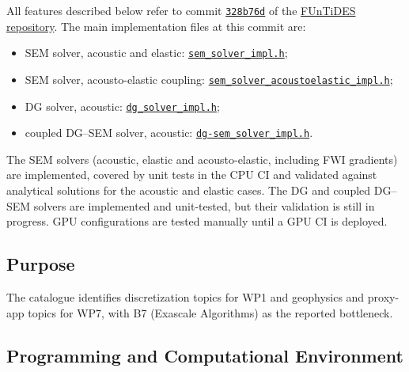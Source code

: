 All features described below refer to commit
\href{https://github.com/FUnTiDES-sim/FUnTiDES/tree/328b76d4c583bd0532de68b2e60e56ce13c694e5}{\texttt{328b76d}}
of the \href{https://github.com/FUnTiDES-sim/FUnTiDES}{FUnTiDES repository}.
The main implementation files at this commit are:
\begin{itemize}
  \item SEM solver, acoustic and elastic:
  \href{https://github.com/FUnTiDES-sim/FUnTiDES/blob/328b76d4c583bd0532de68b2e60e56ce13c694e5/src/solver/fe/impl/common/include/sem_solver_impl.h}{\texttt{sem\_solver\_impl.h}};
  \item SEM solver, acousto-elastic coupling:
  \href{https://github.com/FUnTiDES-sim/FUnTiDES/blob/328b76d4c583bd0532de68b2e60e56ce13c694e5/src/solver/fe/impl/acoustoelastic/include/sem_solver_acoustoelastic_impl.h}{\texttt{sem\_solver\_acoustoelastic\_impl.h}};
  \item DG solver, acoustic:
  \href{https://github.com/FUnTiDES-sim/FUnTiDES/blob/328b76d4c583bd0532de68b2e60e56ce13c694e5/src/solver/fe/DG/impl/common/include/dg_solver_impl.h}{\texttt{dg\_solver\_impl.h}};
  \item coupled DG--SEM solver, acoustic:
  \href{https://github.com/FUnTiDES-sim/FUnTiDES/blob/328b76d4c583bd0532de68b2e60e56ce13c694e5/src/solver/fe/DG-SEm/impl/common/include/dg-sem_solver_impl.h}{\texttt{dg-sem\_solver\_impl.h}}.
\end{itemize}

The SEM solvers (acoustic, elastic and acousto-elastic, including FWI gradients) are implemented,
covered by unit tests in the CPU CI and validated against analytical solutions for the acoustic and elastic cases.
The DG and coupled DG--SEM solvers are implemented and unit-tested, but their validation is still in progress.
GPU configurations are tested manually until a GPU CI is deployed.

\subsection{Purpose}
\label{sec:FUnTiDES:purpose}
The catalogue identifies discretization topics for WP1 and geophysics
and proxy-app topics for WP7, with B7 (Exascale Algorithms) as the
reported bottleneck.

\subsection{Programming and Computational Environment}
\label{sec:FUnTiDES:environment_capabilities}


